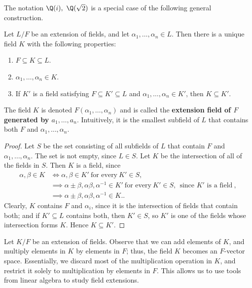 \documentclass[math1530-lecture-notes]{subfiles}
\begin{document}
The notation $\Q(i),\ \Q(\sqrt{2})$ is a special case of the following general construction.
\begin{proposition}{}
  Let $L / F$ be an extension of fields, and let $\alpha_1,\ldots,\alpha_n\in L$. Then there is a
  unique field $K$ with the following properties:
  \begin{enumerate}
    \item $F \subseteq K \subseteq L$.
    \item $\alpha_1,\ldots,\alpha_n\in K$.
    \item If $K'$ is a field satisfying $F\subseteq K'\subseteq L$ and $\alpha_1,\ldots,\alpha_n\in
      K'$, then $K\subseteq K'$.
  \end{enumerate}
  The field $K$ is denoted $F(\alpha_1,\ldots,\alpha_n)$ and is called the \textbf{extension field
  of $F$ generated by $a_1,\ldots,a_n$}. Intuitively, it is the smallest subfield of $L$ that
  contains both $F$ and $\alpha_1,\ldots,\alpha_n$.
\end{proposition}
\begin{proof}[Proof]
  Let $S$ be the set consisting of all subfields of $L$ that contain $F$ and
  $\alpha_1,\ldots,\alpha_n$. The set is not empty, since $L\in S$. Let $K$ be the intersection of
  all of the fields in $S$. Then $K$ is a field, since
  \begin{align*}
    \alpha,\beta\in K &\iff \alpha,\beta\in K' ~\text{for every}~K'\in S,\\
                      &\implies \alpha\pm \beta,\alpha\beta,\alpha^{-1}\in K'~\text{for every}~K'\in
                      S,\ ~\text{since $K'$ is a field}~,\\
                      &\implies\alpha\pm \beta,\alpha\beta,\alpha^{-1}\in K.
  .\end{align*}
  Clearly, $K$ contains $F$ and $\alpha_i$, since it is the intersection of fields that contain
  both; and if $K'\subseteq L$ contains both, then $K'\in S$, so $K'$ is one of the fields whose
  intersection forms $K$. Hence $K\subseteq K'$.
\end{proof}


Let $K / F$ be an extension of fields. Observe that we can add elements of $K$, and multiply elements
in $K$ by elements in $F$; thus, the field $K$ becomes an $F$-vector space. Essentially, we discard
most of the multiplication operation in $K$, and restrict it solely to multiplication by elements in
$F$. This allows us to use tools from linear algebra to study field extensions.
\end{document}
